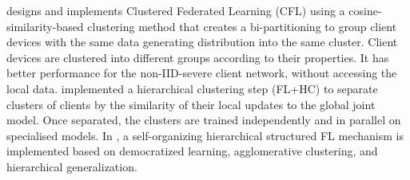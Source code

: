 \documentclass[10pt,twocolumn,letterpaper]{article}
\theoremstyle{definition}
\begin{document}
\cite{sattler2020clustered} designs and implements Clustered Federated Learning (CFL) using a cosine-similarity-based clustering method that creates a bi-partitioning to group client devices with the same data generating distribution into the same cluster.  Client devices are clustered into different groups according to their properties. It has better performance for the non-IID-severe client network, without accessing the local data.
\cite{briggs2020federated} implemented a hierarchical clustering step (FL+HC) to separate clusters of clients by the similarity of their local updates to the global joint model. Once separated, the clusters are trained independently and in parallel on specialised models.
In \cite{nguyen2020self}, a self-organizing hierarchical structured FL mechanism is implemented based on democratized learning, agglomerative clustering, and hierarchical generalization.
\end{document}
